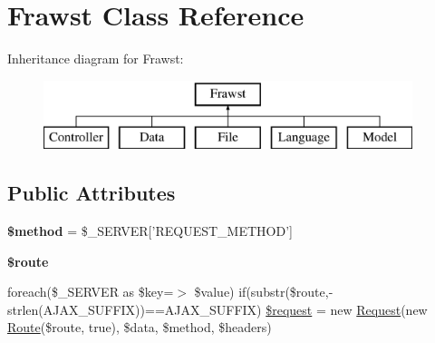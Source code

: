 \hypertarget{classFrawst}{
\section{Frawst Class Reference}
\label{classFrawst}
}
Inheritance diagram for Frawst:\begin{figure}[H]
\begin{center}
\leavevmode
\includegraphics[height=2.000000cm]{classFrawst}
\end{center}
\end{figure}
\subsection*{Public Attributes}
\begin{DoxyCompactItemize}
\item 
\hypertarget{classFrawst_a3efd5952499d6cd33bda3d18bc0c4cbb}{
{\bfseries \$method} = \$\_\-SERVER\mbox{[}'REQUEST\_\-METHOD'\mbox{]}}
\label{classFrawst_a3efd5952499d6cd33bda3d18bc0c4cbb}

\item 
{\bfseries \$route}
\item 
foreach(\$\_\-SERVER as \$key=$>$ \$value) if(substr(\$route,-\/strlen(AJAX\_\-SUFFIX))==AJAX\_\-SUFFIX) \hyperlink{classFrawst_a0db08eb8a67a4f462d0602b663dddc90}{\$request} = new \hyperlink{classRequest}{Request}(new \hyperlink{classRoute}{Route}(\$route, true), \$data, \$method, \$headers)
\end{DoxyCompactItemize}



